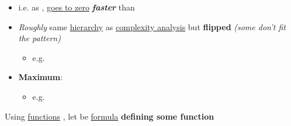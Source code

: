 \begin{itemize}

      \item
            i.e. as ,  \underline{goes to zero}
            \textbf{\emph{faster}} than 
      \item
            \emph{Roughly} same \underline{hierarchy} as \underline{complexity analysis} but
            \textbf{flipped} \emph{(some don't fit the pattern)}

            \begin{itemize}
                  \item e.g. 
            \end{itemize}
      \item
            \textbf{Maximum}:

            \begin{itemize}
                  \item e.g. 
            \end{itemize}
\end{itemize}

\hSep %

Using \underline{functions} , let 
be \underline{formula} \textbf{defining some function}

